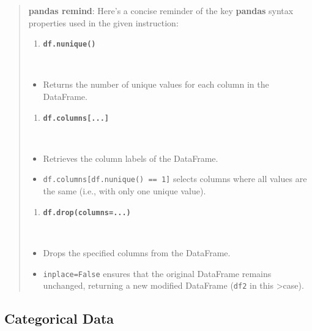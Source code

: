 \documentclass{article}
\providecommand{\tightlist}{%
      \setlength{\itemsep}{0pt}\setlength{\parskip}{0pt}}
\begin{document}
    \begin{quote}
\textbf{pandas remind}: Here's a concise reminder of the key
\textbf{pandas} syntax properties used in the given instruction:

\begin{enumerate}
\def\labelenumi{\arabic{enumi}.}
\tightlist
\item
  \textbf{\texttt{df.nunique()}}\strut \\
\end{enumerate}

\begin{itemize}
\tightlist
\item
  Returns the number of unique values for each column in the DataFrame.
\end{itemize}

\begin{enumerate}
\def\labelenumi{\arabic{enumi}.}
\setcounter{enumi}{1}
\tightlist
\item
  \textbf{\texttt{df.columns{[}...{]}}}\strut \\
\end{enumerate}

\begin{itemize}
\tightlist
\item
  Retrieves the column labels of the DataFrame.
\item
  \texttt{df.columns{[}df.nunique()\ ==\ 1{]}} selects columns where all
  values are the same (i.e., with only one unique value).
\end{itemize}

\begin{enumerate}
\def\labelenumi{\arabic{enumi}.}
\setcounter{enumi}{2}
\tightlist
\item
  \textbf{\texttt{df.drop(columns=...)}}\strut \\
\end{enumerate}

\begin{itemize}
\tightlist
\item
  Drops the specified columns from the DataFrame.
\item
  \texttt{inplace=False} ensures that the original DataFrame remains
  unchanged, returning a new modified DataFrame (\texttt{df2} in this
  \textgreater case).
\end{itemize}
\end{quote}

    \subsection{Categorical Data}\label{categorical-data}
\end{document}
